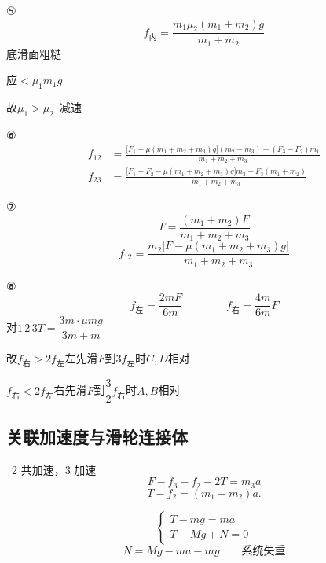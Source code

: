 ⑤
\[
f_{\text{内}}=\frac{m_1\mu_2(m_1+m_2)g}{m_1+m_2}
\]
底滑面粗糙

应$<\mu_1m_1g$

故$\mu_1>\mu_2$\ 减速

⑥
\begin{align*}
f_{12}&=\frac{\bigl[F_1-\mu(m_1+m_2+m_3)g\bigr](m_2+m_3)-(F_3-F_2)m_1}{m_1+m_2+m_3}\\[8pt]
f_{23}&=\frac{\bigl[F_1-F_2-\mu(m_1+m_2+m_3)g\bigr]m_3-F_3(m_1+m_2)}{m_1+m_2+m_3}
\end{align*}

⑦ %
\[
T=\frac{(m_1+m_2)F}{m_1+m_2+m_3}
\]
\[
f_{12}=\frac{m_2\bigl[F-\mu(m_1+m_2+m_3)g\bigr]}{m_1+m_2+m_3}
\]

⑧
\[
f_{\text{左}}=\frac{2mF}{6m}\qquad\qquad f_{\text{右}}=\frac{4m}{6m}F
\]
对$1\,2\,3$\quad $T=\dfrac{3m\cdot\mu mg}{3m+m}$

改\quad $f_{\text{右}}>2f_{\text{左}}$\quad 左先滑\quad $F$到$3f_{\text{左}}$时\quad $C,D$相对 %

$f_{\text{右}}<2f_{\text{左}}$\quad 右先滑\quad $F$到$\dfrac32f_{\text{右}}$时\quad $A,B$相对 %

\subsection{关联加速度与滑轮连接体}
\ 2 共加速，3 加速
\[
F-f_3-f_2-2T=m_3a
\]%
\[
T-f_2=(m_1+m_2)a.
\]

\begin{problem}
\begin{solution}
\[ \begin{cases} T-mg=ma\\ T-Mg+N=0\end{cases} \]
\[ N=Mg-ma-mg\qquad\text{系统失重} \]
\end{solution}
\end{problem}

